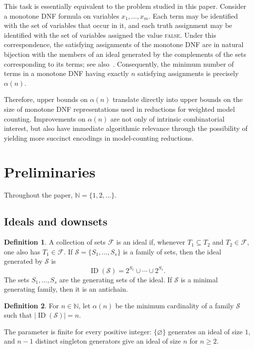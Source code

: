 \documentclass[11pt]{article}
\theoremstyle{definition}
\newtheorem{definition}[definition]{Definition}
\theoremstyle{remark}
\newcommand{\ID}{\operatorname{ID}}
\begin{document}
This task is essentially equivalent to the problem studied in this paper. Consider a monotone DNF formula on variables $x_1,\ldots,x_m$. Each term may be identified with the set of variables that occur in it, and each truth assignment may be identified with the set of variables assigned the value \textsc{false}. Under this correspondence, the satisfying assignments of the monotone DNF are in natural bijection with the members of an ideal generated by the complements of the sets corresponding to its terms; see also~\cite{ChandranGajjalaMeel26}. Consequently, the minimum number of terms in a monotone DNF having exactly $n$ satisfying assignments is precisely $\alpha(n)$.

Therefore, upper bounds on $\alpha(n)$ translate directly into upper bounds on the size of monotone DNF representations used in reductions for weighted model counting. Improvements on $\alpha(n)$ are not only of intrinsic combinatorial interest, but also have immediate algorithmic relevance through the possibility of yielding more succinct encodings in model-counting reductions.

\section{Preliminaries}\label{sec:preliminaries}

Throughout the paper, $\mathbb N=\{1,2,\ldots\}$.

\subsection{Ideals and downsets}

\begin{definition}
A collection of sets $\mathcal F$ is an ideal if, whenever $T_1\subseteq T_2$ and $T_2\in\mathcal F$, one also has $T_1\in\mathcal F$. If $\mathcal S=\{S_1,\ldots,S_s\}$ is a family of sets, then the ideal generated by $\mathcal S$ is
\[
  \ID(\mathcal S)=2^{S_1}\cup\cdots\cup2^{S_s}.
\]
The sets $S_1,\ldots,S_s$ are the generating sets of the ideal. If $\mathcal S$ is a minimal generating family, then it is an antichain.
\end{definition}

\begin{definition}
For $n\in\mathbb N$, let $\alpha(n)$ be the minimum cardinality of a family $\mathcal S$ such that $|\ID(\mathcal S)|=n$.
\end{definition}

The parameter is finite for every positive integer: $\{\varnothing\}$ generates an ideal of size $1$, and $n-1$ distinct singleton generators give an ideal of size $n$ for $n\ge2$.
\end{document}
